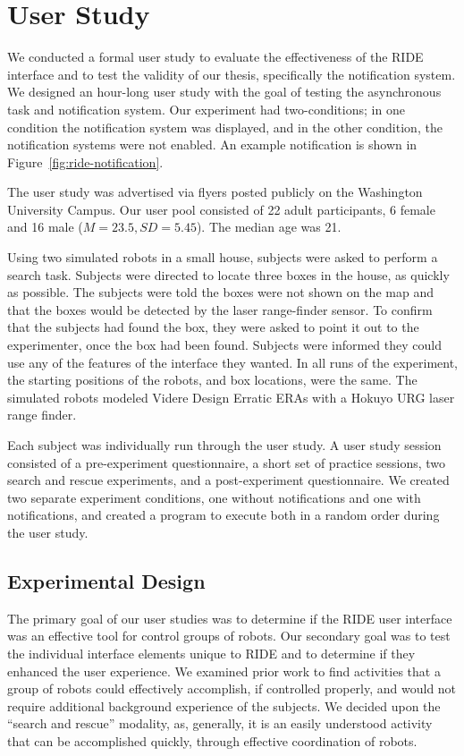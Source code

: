 \chapter{User Study}
We conducted a formal user study to evaluate the effectiveness of the RIDE interface and to test the validity of our thesis, specifically the notification system. We designed an hour-long user study with the goal of testing the asynchronous task and notification system. Our experiment had two-conditions; in one condition the notification system was displayed, and in the other condition, the notification systems were not enabled. An example notification is shown in Figure~\ref{fig:ride-notification}.

The user study was advertised via flyers posted publicly on the Washington University Campus. Our user pool consisted of 22 adult participants, 6 female and 16 male ($M=23.5, SD=5.45$). The median age was 21.

Using two simulated robots in a small house, subjects were asked to perform a search task. Subjects were directed to locate three boxes in the house, as quickly as possible. The subjects were told the boxes were not shown on the map and that the boxes would be detected by the laser range-finder sensor. To confirm that the subjects had found the box, they were asked to point it out to the experimenter, once the box had been found. Subjects were informed they could use any of the features of the interface they wanted. In all runs of the experiment, the starting positions of the robots, and box locations, were the same. The simulated robots modeled Videre Design Erratic ERAs with a Hokuyo URG laser range finder. 

Each subject was individually run through the user study. A user study session consisted of a pre-experiment questionnaire, a short set of practice sessions, two search and rescue experiments, and a post-experiment questionnaire. We created two separate experiment conditions, one without notifications and one with notifications, and created a program to execute both in a random order during the user study.

\section{Experimental Design}
The primary goal of our user studies was to determine if the RIDE user interface was an effective tool for control groups of robots. Our secondary goal was to test the individual interface elements unique to RIDE and to determine if they enhanced the user experience. We examined prior work to find activities that a group of robots could effectively accomplish, if controlled properly, and would not require additional background experience of the subjects. We decided upon the ``search and rescue'' modality, as, generally, it is an easily understood activity that can be accomplished quickly, through effective coordination of robots.

